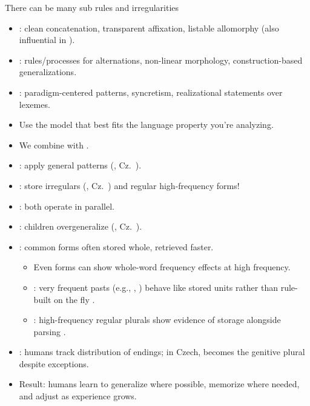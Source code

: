 \documentclass[a4paper,landscape,headrule,footrule]{foils}
\begin{document}
There can be many sub rules and irregularities


\begin{itemize}
  \item {}: clean concatenation, transparent affixation, listable allomorphy (also influential in ). 
  \item {}: rules/processes for alternations, non-linear morphology, construction-based generalizations. 
  \item {}: paradigm-centered patterns, syncretism, realizational statements over lexemes. 
  \item Use the model that best fits the language property you’re analyzing. %
\end{itemize}


\begin{itemize}
  \item We combine  with .
  \item {}: apply general patterns 
    (, Cz.\ ).
  \item {}: store irregulars 
    (, Cz.\ )  and regular high-frequency forms! 
  \item {}: both operate in parallel.
\end{itemize}

\begin{itemize}
  \item {}: children overgeneralize (, Cz.\ ).
  \item {}: common forms often stored whole, retrieved faster.
\begin{itemize}
  \item Even  forms can show whole-word frequency effects at high frequency.
  \item {} : very frequent pasts (e.g., , ) behave like stored units rather than rule-built on the fly \citep{Alegre:Gordon:1999}.
  \item {} : high-frequency regular plurals show evidence of storage alongside parsing \citep{Baayen:Dijkstra:Schreuder:1997}.
\end{itemize}
    
  \item {}: humans track distribution of endings; 
    in Czech,  becomes the  genitive plural despite exceptions.
  \item Result: humans learn to generalize where possible, memorize where needed,
    and adjust as experience grows.
\end{itemize}
\end{document}
